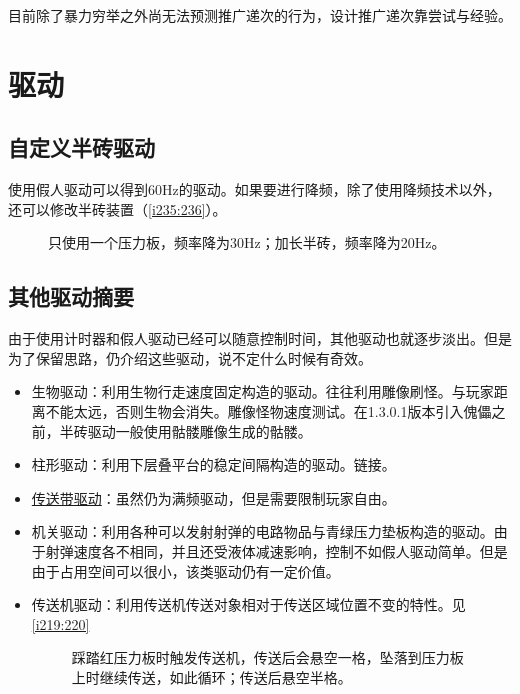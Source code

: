 目前除了暴力穷举之外尚无法预测推广递次的行为，设计推广递次靠尝试与经验。

\section{驱动}

\subsection{自定义半砖驱动}
使用假人驱动可以得到60Hz的驱动。如果要进行降频，除了使用降频技术以外，还可以修改半砖装置（\autoref{i235:236}）。

\begin{figure}[!ht]
  \centering
  \caption{\protect{}只使用一个压力板，频率降为30Hz；\protect{}加长半砖，频率降为20Hz。}
  \label{i235:236}
\end{figure}

\subsection{其他驱动摘要}
由于使用计时器和假人驱动已经可以随意控制时间，其他驱动也就逐步淡出。但是为了保留思路，仍介绍这些驱动，说不定什么时候有奇效。
\begin{itemize}
  \item 生物驱动：利用生物行走速度固定构造的驱动。往往利用雕像刷怪。与玩家距离不能太远，否则生物会消失。雕像怪物速度测试。在1.3.0.1版本引入傀儡之前，半砖驱动一般使用骷髅雕像生成的骷髅。
  \item 柱形驱动：利用下层叠平台的稳定间隔构造的驱动。链接。
  \item \hyperref[exa:conveyorEngine]{传送带驱动}：虽然仍为满频驱动，但是需要限制玩家自由。
  \item 机关驱动：利用各种可以发射射弹的电路物品与青绿压力垫板构造的驱动。由于射弹速度各不相同，并且还受液体减速影响，控制不如假人驱动简单。但是由于占用空间可以很小，该类驱动仍有一定价值。
  \item 传送机驱动：利用传送机传送对象相对于传送区域位置不变的特性。见\autoref{i219:220}

        \begin{figure}[!ht]
          \centering
          \caption{\protect{}踩踏红压力板时触发传送机，传送后会悬空一格，坠落到压力板上时继续传送，如此循环；\protect{}传送后悬空半格。}
          \label{i219:220}
        \end{figure}

\end{itemize}

